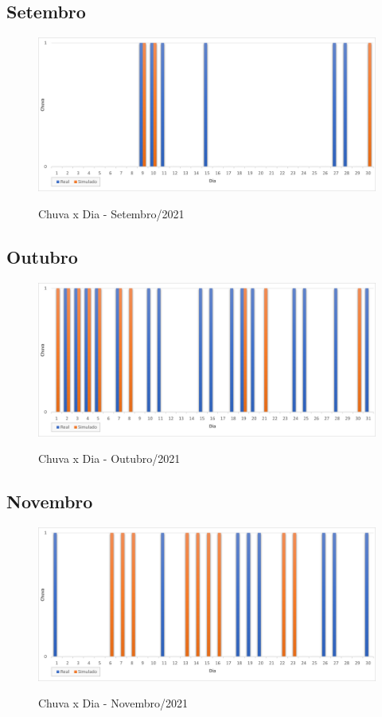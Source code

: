 \subsection{Setembro}
\begin{figure}[H]
	\caption{\small Chuva x Dia - Setembro/2021}
	\centering
	\includegraphics[width=\textwidth]{figs/set.png}
	\label{f.rset}
\end{figure}

\subsection{Outubro}
\begin{figure}[H]
	\caption{\small Chuva x Dia - Outubro/2021}
	\centering
	\includegraphics[width=\textwidth]{figs/out.png}
	\label{f.rout}
\end{figure}

\subsection{Novembro}
\begin{figure}[H]
	\caption{\small Chuva x Dia - Novembro/2021}
	\centering
	\includegraphics[width=\textwidth]{figs/nov.png}
	\label{f.rnov}
\end{figure}

